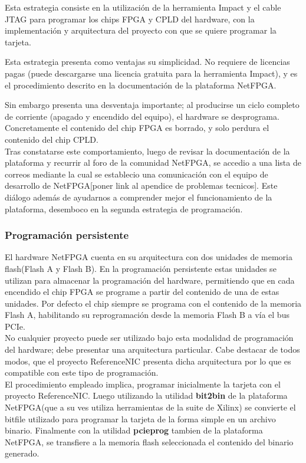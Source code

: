 Esta estrategia consiste en la utilizaci\'on de la herramienta Impact y el cable JTAG para programar los chips FPGA y CPLD del hardware, con la implementaci\'on y arquitectura del proyecto con que se quiere programar la tarjeta.

Esta estrategia presenta como ventajas su simplicidad. No requiere de licencias pagas (puede descargarse una licencia gratuita para la herramienta Impact), y es el procedimiento descrito en la documentaci\'on de la plataforma NetFPGA.

Sin embargo presenta una desventaja importante; al producirse un ciclo completo de corriente (apagado y encendido del equipo), el hardware se desprograma. Concretamente el contenido del chip FPGA es borrado, y solo perdura el contenido del chip CPLD.\\

Tras constatarse este comportamiento, luego de revisar la documentaci\'on de la plataforma y recurrir al foro de la comunidad NetFPGA, se accedio a una lista de correos mediante la cual se establecio una comunicaci\'on con el equipo de desarrollo de NetFPGA[poner link al apendice de problemas tecnicos]. Este di\'alogo adem\'as de ayudarnos a comprender mejor el funcionamiento de la plataforma, desemboco en la segunda estrategia de programaci\'on.

\subsubsection{Programaci\'on persistente}
El hardware NetFPGA cuenta en su arquitectura con dos unidades de memoria flash(Flash A y Flash B). En la programaci\'on persistente estas unidades se utilizan para almacenar la programaci\'on del hardware, permitiendo que en cada encendido el chip FPGA se programe a partir del contenido de una de estas unidades. Por defecto el chip siempre se programa con el contenido de la memoria Flash A, habilitando su reprogramaci\'on desde la memoria Flash B a v\'ia el bus PCIe.\\

No cualquier proyecto puede ser utilizado bajo esta modalidad de programaci\'on del hardware; debe presentar una arquitectura particular. Cabe destacar de todos modos, que el proyecto ReferenceNIC presenta dicha arquitectura por lo que es compatible con este tipo de programaci\'on.\\

El procedimiento empleado implica, programar inicialmente la tarjeta con el proyecto ReferenceNIC. Luego utilizando la utilidad \textbf{bit2bin} de la plataforma NetFPGA(que a su ves utiliza herramientas de la suite de Xilinx) se convierte el bitfile utilizado para programar la tarjeta de la forma simple en un archivo binario. Finalmente con la utilidad \textbf{pcieprog}  tambien de la plataforma NetFPGA, se transfiere a la memoria flash seleccionada el contenido del binario generado.\\


